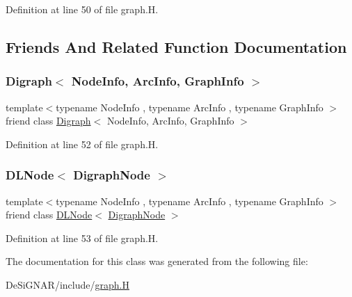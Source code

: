 Definition at line 50 of file graph.\+H.



\subsection{Friends And Related Function Documentation}
\mbox{\label{class_designar_1_1_digraph_node_abc8f370e4ec7084a6574cf967a5a5aaf}} 
\subsubsection{\texorpdfstring{Digraph$<$ Node\+Info, Arc\+Info, Graph\+Info $>$}{Digraph< NodeInfo, ArcInfo, GraphInfo >}}
{\footnotesize\ttfamily template$<$typename Node\+Info , typename Arc\+Info , typename Graph\+Info $>$ \\
friend class \hyperlink{class_designar_1_1_digraph}{Digraph}$<$ Node\+Info, Arc\+Info, Graph\+Info $>$\hspace{0.3cm}{\ttfamily [friend]}}



Definition at line 52 of file graph.\+H.

\mbox{\label{class_designar_1_1_digraph_node_a5532eb461a543edfe19acf97b74316fc}} 
\subsubsection{\texorpdfstring{D\+L\+Node$<$ Digraph\+Node $>$}{DLNode< DigraphNode >}}
{\footnotesize\ttfamily template$<$typename Node\+Info , typename Arc\+Info , typename Graph\+Info $>$ \\
friend class \hyperlink{class_designar_1_1_d_l_node}{D\+L\+Node}$<$ \hyperlink{class_designar_1_1_digraph_node}{Digraph\+Node} $>$\hspace{0.3cm}{\ttfamily [friend]}}



Definition at line 53 of file graph.\+H.



The documentation for this class was generated from the following file\+:\begin{DoxyCompactItemize}
\item 
De\+Si\+G\+N\+A\+R/include/\hyperlink{graph_8_h}{graph.\+H}\end{DoxyCompactItemize}
